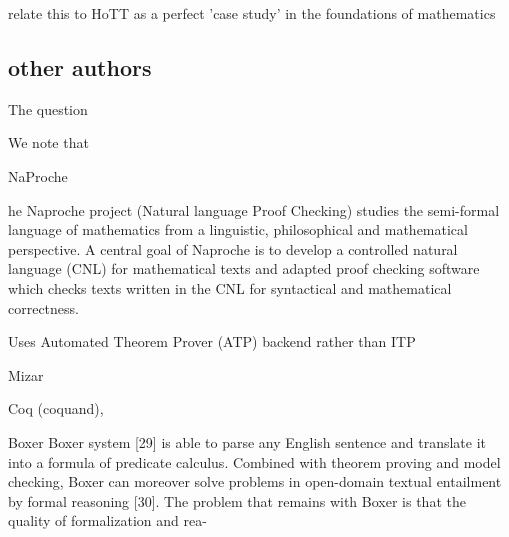 relate this to HoTT as a perfect 'case study' in the foundations of mathematics


\subsection{other authors}

The question 

We note that 

NaProche

he Naproche project (Natural language Proof Checking) studies the semi-formal language of mathematics from a linguistic, philosophical and mathematical perspective. A central goal of Naproche is to develop a controlled natural language (CNL) for mathematical texts and adapted proof checking software which checks texts written in the CNL for syntactical and mathematical correctness. 

Uses Automated Theorem Prover (ATP) backend rather than ITP


Mizar

Coq (coquand), 

Boxer
Boxer system [29] is able to parse any English sentence and translate it into a formula
of predicate calculus. Combined with theorem proving and model checking, Boxer can
moreover solve problems in open-domain textual entailment by formal reasoning [30].
The problem that remains with Boxer is that the quality of formalization and rea-
